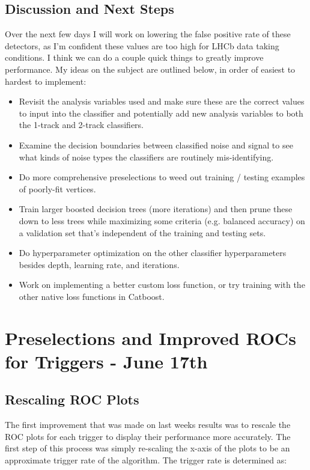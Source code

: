 \documentclass[12pt, letterpaper]{article}
\begin{document}
\subsection{Discussion and Next Steps}
Over the next few days I will work on lowering the false positive rate of these detectors, as I'm confident these values are too high for LHCb data taking conditions. I think we can do a couple quick things to greatly improve performance. My ideas on the subject are outlined below, in order of easiest to hardest to implement:
\begin{itemize}

\item Revisit the analysis variables used and make sure these are the correct values to input into the classifier and potentially add new analysis variables to both the 1-track and 2-track classifiers.

\item Examine the decision boundaries between classified noise and signal to see what kinds of noise types the classifiers are routinely mis-identifying.

\item Do more comprehensive preselections to weed out training / testing examples of poorly-fit vertices.

\item Train larger boosted decision trees (more iterations) and then prune these down to less trees while maximizing some criteria (e.g. balanced accuracy) on a validation set that's independent of the training and testing sets.

\item Do hyperparameter optimization on the other classifier hyperparameters besides depth, learning rate, and iterations.

\item Work on implementing a better custom loss function, or try training with the other native loss functions in Catboost.

\end{itemize}


\section{Preselections and Improved ROCs for Triggers - June 17th}

\subsection{Rescaling ROC Plots}
The first improvement that was made on last weeks results was to rescale the ROC plots for each trigger to display their performance more accurately. The first step of this process was simply re-scaling the x-axis of the plots to be an approximate trigger rate of the algorithm. The trigger rate is determined as:
\end{document}
